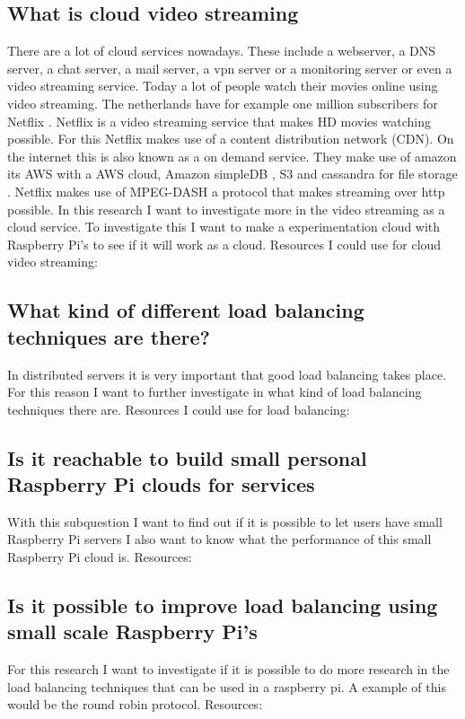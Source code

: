 \documentclass{sig-alternate-br}
\begin{document}
\subsection{What is cloud video streaming}
There are a lot of cloud services nowadays. These include a webserver, a DNS server, a chat server, a mail server, a vpn server or a monitoring server or even a video streaming service. 
Today a lot of people watch their movies online using video streaming. The netherlands have for example one million subscribers for Netflix \cite{volkskrant}. Netflix is a video streaming service that makes HD movies watching possible. For this Netflix makes use of a content distribution network (CDN). On the internet this is also known as a on demand service. They make use of amazon its AWS with a AWS cloud, Amazon simpleDB , S3 and cassandra for file storage \cite{Adhikari:2012}. Netflix makes use of MPEG-DASH a protocol that makes streaming over http possible. In this research I want to investigate more in the video streaming as a cloud service. 
To investigate this I want to make a experimentation cloud with Raspberry Pi's to see if it will work as a cloud. 
Resources I could use for cloud video streaming:
\cite{g-streamer,raspberry-video,video-1080p, plissonneau:2012}
 
\subsection{What kind of different load balancing techniques are there?}
In distributed servers it is very important that good load balancing takes place. For this reason I want to further investigate in what kind of load balancing techniques there are. 
Resources I could use for load balancing:
\cite{nginx-load-balancing,nginx-load-balancing-2,computer-networking,wolf:1997,load-balancing}

 
\subsection{Is it reachable to build small personal Raspberry Pi clouds for services}
With this subquestion I want to find out if it is possible to let users have small Raspberry Pi servers I also want to know what the performance of this small Raspberry Pi cloud is. 
Resources:
\cite{Pcextreme,nginx-load-balancing,nginx-load-balancing-2}

\subsection{Is it possible to improve load balancing using small scale Raspberry Pi's}
For this research I want to investigate if it is possible to do more research in the 
load balancing techniques that can be used in a raspberry pi. A example of this would be the round robin protocol.
Resources:
\cite{nginx-load-balancing,nginx-load-balancing-2}
\end{document}
